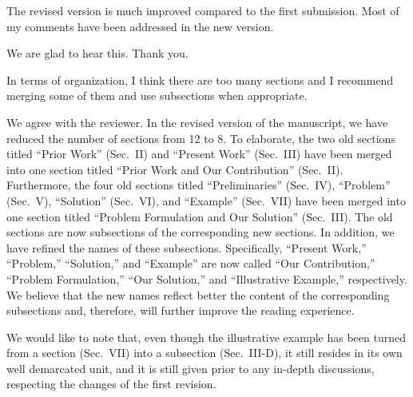 \begin{reviewer}
The revised version is much improved compared to the first submission. Most of
my comments have been addressed in the new version.
\end{reviewer}

\begin{authors}
We are glad to hear this. Thank you.
\end{authors}

\begin{reviewer}
In terms of organization, I think there are too many sections and I recommend
merging some of them and use subsections when appropriate.
\end{reviewer}

\begin{authors}
We agree with the reviewer. In the revised version of the manuscript, we have
reduced the number of sections from 12 to 8. To elaborate, the two old sections
titled ``Prior Work'' (Sec.~II) and ``Present Work'' (Sec.~III) have been merged
into one section titled ``Prior Work and Our Contribution'' (Sec.~II).
Furthermore, the four old sections titled ``Preliminaries'' (Sec.~IV),
``Problem'' (Sec.~V), ``Solution'' (Sec.~VI), and ``Example'' (Sec.~VII) have
been merged into one section titled ``Problem Formulation and Our Solution''
(Sec.~III). The old sections are now subsections of the corresponding new
sections. In addition, we have refined the names of these subsections.
Specifically, ``Present Work,'' ``Problem,'' ``Solution,'' and ``Example'' are
now called ``Our Contribution,'' ``Problem Formulation,'' ``Our Solution,'' and
``Illustrative Example,'' respectively. We believe that the new names reflect
better the content of the corresponding subsections and, therefore, will further
improve the reading experience.

We would like to note that, even though the illustrative example has been turned
from a section (Sec.~VII) into a subsection (Sec.~III-D), it still resides in
its own well demarcated unit, and it is still given prior to any in-depth
discussions, respecting the changes of the first revision.

\begin{actions}

\end{actions}
\end{authors}

